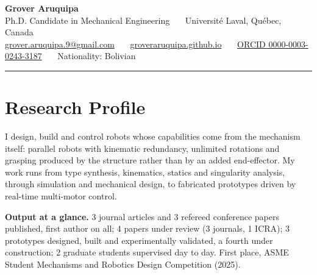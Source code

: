 \documentclass[11pt,letterpaper]{article}
\begin{document}
\begin{center}
{\LARGE\bfseries\color{ink} Grover Aruquipa}\\[4pt]
{\small Ph.D. Candidate in Mechanical Engineering \ \textbullet\ \ Universit\'e Laval, Qu\'ebec, Canada}\\[3pt]
{\footnotesize
\href{mailto:grover.aruquipa.9@gmail.com}{grover.aruquipa.9@gmail.com} \ \textbullet\ \
\href{https://groveraruquipa.github.io}{groveraruquipa.github.io} \ \textbullet\ \
\href{https://orcid.org/0000-0003-0243-3187}{ORCID 0000-0003-0243-3187} \ \textbullet\ \
Nationality: Bolivian}\\[4pt]
{\color{ink}\rule{0.55\linewidth}{1.1pt}}
\end{center}

\section{Research Profile}
{\footnotesize I design, build and control robots whose capabilities come from the mechanism itself: parallel robots
with kinematic redundancy, unlimited rotations and grasping produced by the structure rather than by an added
end-effector. My work runs from type synthesis, kinematics, statics and singularity analysis, through simulation and
mechanical design, to fabricated prototypes driven by real-time multi-motor control.\par
\vspace{3pt}
\textbf{Output at a glance.} 3 journal articles and 3 refereed conference papers published, first author on all;
4 papers under review (3 journals, 1 ICRA); 3 prototypes designed, built and experimentally validated, a fourth under
construction; 2 graduate students supervised day to day. First place, ASME Student Mechanisms and Robotics Design
Competition (2025).}

\end{document}
